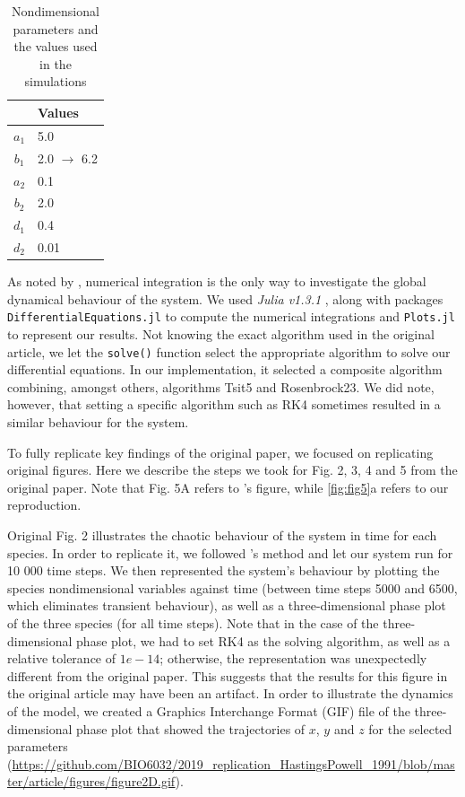 \begin{table}[!htb]
  \centering
  \caption{Nondimensional parameters and the values used in the simulations}
  \label{tbl:table1}
  \begin{tabular}{c l}
    \hline
    & Values \\
    \hline
    $a_1$ & 5.0 \\
    $b_1$ & 2.0 $\rightarrow$ 6.2 \\
    $a_2$ & 0.1 \\
    $b_2$ & 2.0 \\
    $d_1$ & 0.4 \\
    $d_2$ & 0.01 \\
    \hline
  \end{tabular}
\end{table}

As noted by \citeauthor{hastings1991}, numerical integration is the only way to investigate the
global dynamical behaviour of the system.
We used \textit{Julia v1.3.1} \citep{bezanson2017}, along with packages \verb| DifferentialEquations.jl|
\citep{rackauckas2017} to compute the numerical integrations and \verb|Plots.jl| to represent
our results.
Not knowing the exact algorithm used in the original article, we let the \verb|solve()| function
select the appropriate algorithm to solve our differential equations.
In our implementation, it selected a composite algorithm combining, amongst others,
algorithms Tsit5 and Rosenbrock23.
We did note, however, that setting a specific algorithm such as RK4 sometimes resulted in a similar
behaviour for the system.

To fully replicate key findings of the original paper, we focused on replicating
original figures.
Here we describe the steps we took for Fig. 2, 3, 4 and 5 from the original paper.
Note that Fig. 5A refers to \citeauthor{hastings1991}'s figure, while \autoref{fig:fig5}a
refers to our reproduction.

Original Fig. 2 illustrates the chaotic behaviour of the system in time for each species.
In order to replicate it, we followed \citeauthor{hastings1991}'s method and let our system
run for 10 000 time steps.
We then represented the system's behaviour by plotting the species nondimensional
variables against time (between time steps 5000 and 6500, which eliminates transient
behaviour), as well as a three-dimensional phase plot of the three species (for all time
steps). Note that in the case of the three-dimensional phase plot, we had to set RK4 as
the solving algorithm, as well as a relative tolerance of $1e-14$; otherwise, the
representation was unexpectedly different from the original paper.
This suggests that the results for this figure in the original article may have been an
artifact.
In order to illustrate the dynamics of the model, we created a Graphics Interchange Format
(GIF) file of the three-dimensional phase plot that showed the trajectories of $x$, $y$
and $z$ for the selected parameters (\url{https://github.com/BIO6032/2019_replication_HastingsPowell_1991/blob/master/article/figures/figure2D.gif}).

